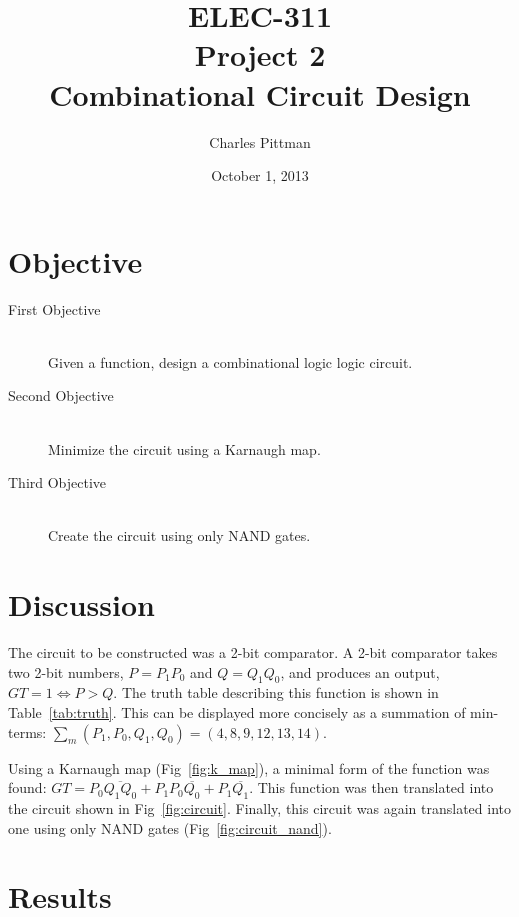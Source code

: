 \documentclass{article}
\author{Charles Pittman}
\title{ELEC-311\\ Project 2\\ Combinational Circuit Design}
\date{October 1, 2013}
\begin{document}
\maketitle %

\pagebreak

\renewcommand{\labelenumi}{\alph{enumi}.}

\section{Objective}
\label{sec:objective}

 \begin{description}
 \item[First Objective] \hfill \\
   Given a function, design a combinational logic logic circuit.
 \item[Second Objective] \hfill \\
   Minimize the circuit using a Karnaugh map.
 \item[Third Objective] \hfill \\
   Create the circuit using only NAND gates.
 \end{description}

\section{Discussion}
\label{sec:procedure}

The circuit to be constructed was a 2-bit comparator.  A 2-bit
comparator takes two 2-bit numbers, $P = P_1P_0$ and $Q = Q_1Q_0$, and
produces an output, $GT=1 \iff P>Q$.  The truth table describing this
function is shown in Table~\ref{tab:truth}.  This can be displayed
more concisely as a summation of min-terms: $\sum_m(P_1, P_0, Q_1,
Q_0) = (4, 8, 9, 12, 13,14)$.

Using a Karnaugh map (Fig~\ref{fig:k_map}), a minimal form of the
function was found: $GT = P_0 \overline{Q_1 Q_0} + P_1 P_0
\overline{Q_0} + P_1 \overline{Q_1}$.  This function was then
translated into the circuit shown in Fig~\ref{fig:circuit}.  Finally,
this circuit was again translated into one using only NAND gates
(Fig~\ref{fig:circuit_nand}).

\section{Results}
\label{sec:results}
\end{document}
